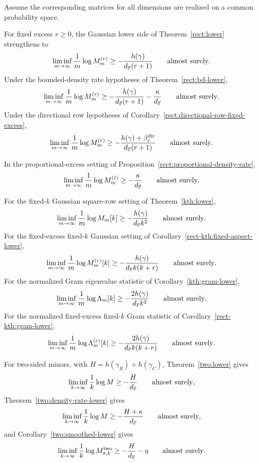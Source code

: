 \begin{corollary}\label{cor:as-geometric-lower-envelopes}
Assume the corresponding matrices for all dimensions are realized on a common
probability space.

For fixed excess \(r\ge0\), the Gaussian lower side of
Theorem~\ref{rect:lower} strengthens to
\[
  \liminf_{m\to\infty}\frac1m\log M_m^{(r)}
  \ge -\frac{h(\gamma)}{d_{\mathbb{F}}(r+1)}
  \qquad\hbox{almost surely}.
\]
Under the bounded-density rate hypotheses of Theorem~\ref{rect:bd-lower},
\[
  \liminf_{m\to\infty}\frac1m\log M_m^{(r)}
  \ge -\frac{h(\gamma)}{d_{\mathbb{F}}(r+1)}-\frac{\kappa}{d_{\mathbb{F}}}
  \qquad\hbox{almost surely}.
\]
Under the directional row hypotheses of
Corollary~\ref{rect:directional-row-fixed-excess},
\[
  \liminf_{m\to\infty}\frac1m\log M_m^{(r)}
  \ge -\frac{h(\gamma)+\beta_r^{\rm dir}}{d_{\mathbb{F}}(r+1)}
  \qquad\hbox{almost surely}.
\]

In the proportional-excess setting of
Proposition~\ref{rect:proportional-density-rate},
\[
  \liminf_{m\to\infty}\frac1m\log M_m^{(\ell)}
  \ge -\frac{\kappa}{d_{\mathbb{F}}}
  \qquad\hbox{almost surely}.
\]

For the fixed-\(k\) Gaussian square-row setting of Theorem~\ref{kth:lower},
\[
  \liminf_{m\to\infty}\frac1m\log M_m[k]
  \ge -\frac{h(\gamma)}{d_{\mathbb{F}} k^2}
  \qquad\hbox{almost surely}.
\]
For the fixed-excess fixed-\(k\) Gaussian setting of
Corollary~\ref{rect-kth:fixed-aspect-lower},
\[
  \liminf_{m\to\infty}\frac1m\log M_m^{(r)}[k]
  \ge -\frac{h(\gamma)}{d_{\mathbb{F}} k(k+r)}
  \qquad\hbox{almost surely}.
\]
For the normalized Gram eigenvalue statistic of
Corollary~\ref{kth:gram-lower},
\[
  \liminf_{m\to\infty}\frac1m\log \Lambda_m[k]
  \ge -\frac{2h(\gamma)}{d_{\mathbb{F}} k^2}
  \qquad\hbox{almost surely}.
\]
For the normalized fixed-excess fixed-\(k\) Gram statistic of
Corollary~\ref{rect-kth:gram-lower},
\[
  \liminf_{m\to\infty}\frac1m\log \Lambda_m^{(r)}[k]
  \ge -\frac{2h(\gamma)}{d_{\mathbb{F}} k(k+r)}
  \qquad\hbox{almost surely}.
\]

For two-sided minors, with \(H=h(\gamma_R)+h(\gamma_C)\),
Theorem~\ref{two:lower} gives
\[
  \liminf_{k\to\infty}\frac1k\log M
  \ge -\frac{H}{d_{\mathbb{F}}}
  \qquad\hbox{almost surely},
\]
Theorem~\ref{two:density-rate-lower} gives
\[
  \liminf_{k\to\infty}\frac1k\log M
  \ge -\frac{H+\kappa}{d_{\mathbb{F}}}
  \qquad\hbox{almost surely},
\]
and Corollary~\ref{two:smoothed-lower} gives
\[
  \liminf_{k\to\infty}\frac1k\log M_{\sigma,k}^{\rm two}
  \ge -\frac{H}{d_{\mathbb{F}}}-\eta
  \qquad\hbox{almost surely}.
\]
\end{corollary}

